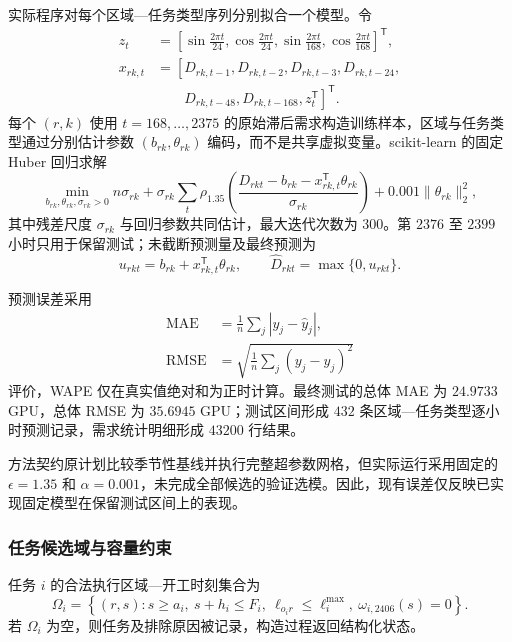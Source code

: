 \documentclass[withoutpreface,bwprint]{cumcmthesis}
\begin{document}
实际程序对每个区域—任务类型序列分别拟合一个模型。令
\begin{align}
z_t&=\left[
\sin\frac{2\pi t}{24},
\cos\frac{2\pi t}{24},
\sin\frac{2\pi t}{168},
\cos\frac{2\pi t}{168}
\right]^{\mathsf T},\\
x_{rk,t}&=\left[D_{rk,t-1},D_{rk,t-2},D_{rk,t-3},D_{rk,t-24},\right.\nonumber\\
&\qquad\left.D_{rk,t-48},D_{rk,t-168},z_t^{\mathsf T}\right]^{\mathsf T}.
\end{align}
每个 $(r,k)$ 使用 $t=168,\ldots,2375$ 的原始滞后需求构造训练样本，区域与任务类型通过分别估计参数 $(b_{rk},\theta_{rk})$ 编码，而不是共享虚拟变量。scikit-learn 的固定 Huber 回归求解
\begin{equation}
\min_{b_{rk},\theta_{rk},\sigma_{rk}>0}
 n\sigma_{rk}+\sigma_{rk}\sum_t
 \rho_{1.35}\!\left(\frac{D_{rkt}-b_{rk}-x_{rk,t}^{\mathsf T}\theta_{rk}}{\sigma_{rk}}\right)
 +0.001\lVert\theta_{rk}\rVert_2^2,
\end{equation}
其中残差尺度 $\sigma_{rk}$ 与回归参数共同估计，最大迭代次数为 $300$。第 $2376$ 至 $2399$ 小时只用于保留测试；未截断预测量及最终预测为
\begin{equation}
u_{rkt}=b_{rk}+x_{rk,t}^{\mathsf T}\theta_{rk},\qquad
\widehat D_{rkt}=\max\{0,u_{rkt}\}.
\end{equation}

预测误差采用
\begin{align}
\mathrm{MAE}&=\frac{1}{n}\sum_j|y_j-\widehat y_j|,\\
\mathrm{RMSE}&=\sqrt{\frac{1}{n}\sum_j(y_j-\widehat y_j)^2}
\end{align}
评价，WAPE 仅在真实值绝对和为正时计算。最终测试的总体 MAE 为 $24.9733$ GPU，总体 RMSE 为 $35.6945$ GPU；测试区间形成 $432$ 条区域—任务类型逐小时预测记录，需求统计明细形成 $43200$ 行结果。

方法契约原计划比较季节性基线并执行完整超参数网格，但实际运行采用固定的 $\epsilon=1.35$ 和 $\alpha=0.001$，未完成全部候选的验证选模。因此，现有误差仅反映已实现固定模型在保留测试区间上的表现。

\subsubsection{任务候选域与容量约束}

任务 $i$ 的合法执行区域—开工时刻集合为
\begin{equation}
\Omega_i=\left\{(r,s):s\ge a_i,\ s+h_i\le F_i,\
\ell_{o_ir}\le\ell_i^{\max},\ \omega_{i,2406}(s)=0\right\}.
\end{equation}
若 $\Omega_i$ 为空，则任务及排除原因被记录，构造过程返回结构化状态。
\end{document}
